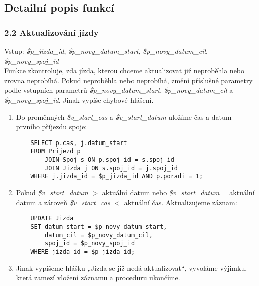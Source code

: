 \documentclass[11pt]{article}
\begin{document}
\subsection{Detailní popis funkcí}


\subsubsection*{2.2 Aktualizování jízdy}
Vstup: \textit{\$p\_jizda\_id}, \textit{\$p\_novy\_datum\_start}, \textit{\$p\_novy\_datum\_cil}, \textit{\$p\_novy\_spoj\_id}\\
Funkce zkontroluje, zda jízda, kterou chceme aktualizovat již neproběhla nebo zrovna neprobíhá. Pokud neproběhla nebo neprobíhá, změní příslušné parametry podle vstupních parametrů \textit{\$p\_novy\_datum\_start}, \textit{\$p\_novy\_datum\_cil} a \textit{\$p\_novy\_spoj\_id}. Jinak vypíše chybové hlášení.

\begin{enumerate}
    \item Do proměnných \textit{\$v\_start\_cas} a \textit{\$v\_start\_datum} uložíme čas a datum prvního příjezdu spoje:
    \begin{lstlisting}
    SELECT p.cas, j.datum_start
    FROM Prijezd p
        JOIN Spoj s ON p.spoj_id = s.spoj_id
        JOIN Jizda j ON s.spoj_id = j.spoj_id
    WHERE j.jizda_id = $p_jizda_id AND p.poradi = 1;
    \end{lstlisting}
    
    \item Pokud \textit{\$v\_start\_datum} $>$ aktuální datum nebo \textit{\$v\_start\_datum} = aktuální datum a zároveň \textit{\$v\_start\_cas} $<$ aktuální čas. Aktualizujeme záznam:
    \begin{lstlisting}
    UPDATE Jizda 
    SET datum_start = $p_novy_datum_start, 
        datum_cil = $p_novy_datum_cil, 
        spoj_id = $p_novy_spoj_id
    WHERE jizda_id = $p_jizda_id;
    \end{lstlisting}

    \item Jinak vypíšeme hlášku „Jízda se již nedá aktualizovat“, vyvoláme výjimku, která zamezí vložení záznamu a proceduru ukončíme.
\end{enumerate}

\end{document}
